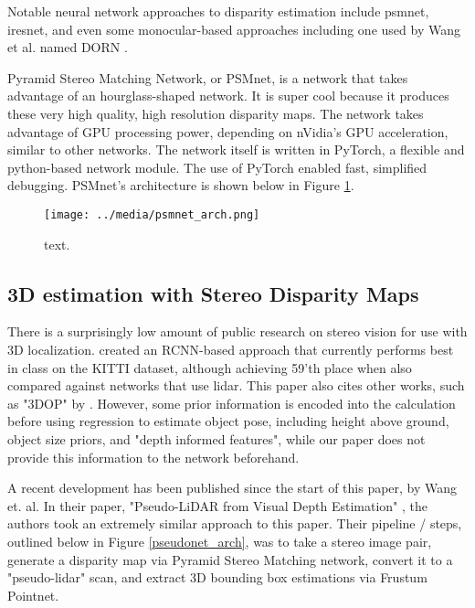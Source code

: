 Notable neural network approaches to disparity estimation include psmnet, iresnet, and even some monocular-based approaches including one used by Wang et al. named DORN \cite{DBLP:journals/corr/abs-1806-02446}.

Pyramid Stereo Matching Network, or PSMnet, is a network that takes advantage of an hourglass-shaped network. It is super cool because it produces these very high quality, high resolution disparity maps. The network takes advantage of GPU processing power, depending on nVidia's GPU acceleration, similar to other networks. The network itself is written in PyTorch, a flexible and python-based network module. The use of PyTorch enabled fast, simplified debugging. PSMnet's architecture is shown below in Figure \ref{psmnet_arch}. 


\begin{figure}[h] %
    \texttt{[image: ../media/psmnet\_arch.png]}
    \caption{text.}
    \label{psmnet_arch} %
\end{figure}




\subsection{3D estimation with Stereo Disparity Maps}
There is a surprisingly low amount of public research on stereo vision for use with 3D localization. \cite{li_stereo_2019} created an RCNN-based approach that currently performs best in class on the KITTI dataset, although achieving 59'th place when also compared against networks that use lidar. This paper also cites other works, such as "3DOP" by \cite{chen_3d_2016}. However, some prior information is encoded into the calculation before using regression to estimate object pose, including height above ground, object size priors, and "depth informed features", while our paper does not provide this information to the network beforehand.

A recent development has been published since the start of this paper, by Wang et. al. In their paper, "Pseudo-LiDAR from Visual Depth Estimation" \cite{wang_pseudo-lidar_2019}, the authors took an extremely similar approach to this paper. Their pipeline / steps, outlined below in Figure \ref{pseudonet_arch}, was to take a stereo image pair, generate a disparity map via Pyramid Stereo Matching network, convert it to a "pseudo-lidar" scan, and extract 3D bounding box estimations via Frustum Pointnet. \\

